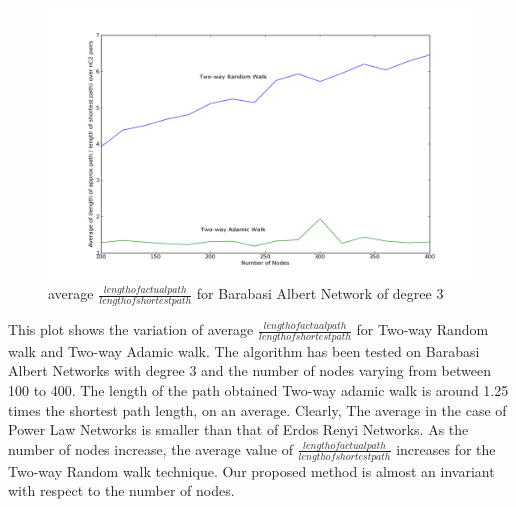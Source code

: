 \documentclass[a4paper,12pt]{article}
\begin{document}
\begin{figure}[htp]
\centering
\includegraphics[scale=0.40]{Results/SFNratio2Random2Adamic.png}
\caption{average $\frac{length of actual path}{length of shortest path}$ for Barabasi Albert Network of degree 3}
\label{SFNratio2Random2Adamic}
\end{figure}
This plot shows the variation of average $\frac{length of actual path}{length of shortest path}$ for Two-way Random walk and Two-way Adamic walk. The algorithm has been tested on Barabasi Albert Networks with degree 3 and the number of nodes varying from between 100 to 400. The length of the path obtained Two-way adamic walk is around 1.25 times the shortest path length, on an average. Clearly, The average in the case of Power Law Networks is smaller than that of Erdos Renyi Networks. As the number of nodes increase, the average value of $\frac{length of actual path}{length of shortest path}$ increases for the Two-way Random walk technique. Our proposed method is almost an invariant with respect to the number of nodes. 
\end{document}
